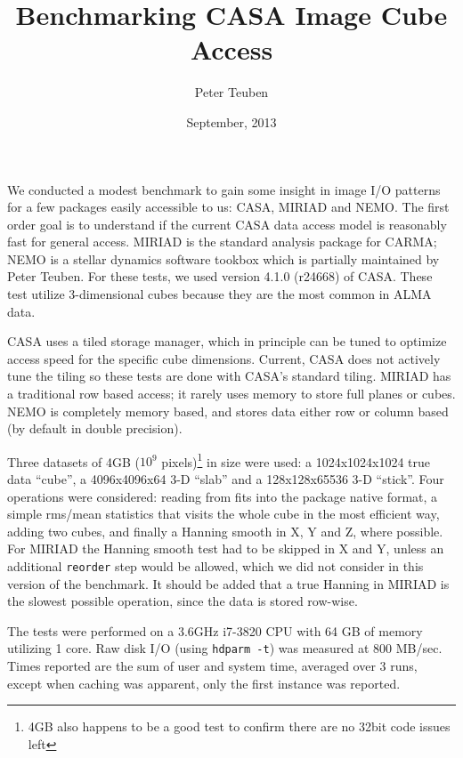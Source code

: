 \documentclass{article}
\title{Benchmarking CASA Image Cube Access}
\author{Peter Teuben}
\date{September, 2013}
\begin{document}
\maketitle


We conducted a modest benchmark to gain some insight in image
I/O patterns for a few packages easily accessible to us: CASA,
MIRIAD and NEMO. The first order goal is to understand if the
current CASA data access model is reasonably fast for general
access.
MIRIAD is the standard analysis package for
CARMA; NEMO is a stellar dynamics software tookbox which is
partially maintained by Peter Teuben. For these tests, we
used version 4.1.0 (r24668) of CASA. These test utilize 3-dimensional cubes
because they are the most common in ALMA data.

CASA uses a tiled storage manager, which in principle
can be tuned to optimize access speed for the specific
cube dimensions.  Current, CASA does not actively tune
the tiling so these tests are done with CASA's standard tiling.
MIRIAD has a traditional row based access; it rarely
uses memory to store full planes or cubes. NEMO is completely
memory based, and stores data either row or column based
(by default in double precision).

Three datasets of 4GB ($10^9$ pixels)\footnote{4GB also happens to
be a good test to confirm there are no 32bit code issues left}
in size were used:
a 1024x1024x1024 true data ``cube'',
a 4096x4096x64 3-D ``slab'' and a 128x128x65536 3-D ``stick''.
Four operations were considered:  reading from fits
into the package native format,
a simple rms/mean statistics that visits the whole cube in the
most efficient way, adding two cubes, and finally
a Hanning smooth in X, Y and Z, where possible.  For MIRIAD
the Hanning smooth test had to be skipped in X and Y, unless
an additional {\tt reorder} step would be allowed, which we did
not consider in this version of the benchmark.
It should be added that a true Hanning in MIRIAD
is the slowest possible operation, since the data is stored
row-wise.

The tests were performed on a 3.6GHz i7-3820 CPU with 64 GB of memory 
utilizing 1 core.  Raw disk I/O (using {\tt hdparm -t}) was measured at
800 MB/sec. Times reported are the sum of user and system time, averaged
over 3 runs, except when caching was apparent, only the first instance 
was reported.
\end{document}
